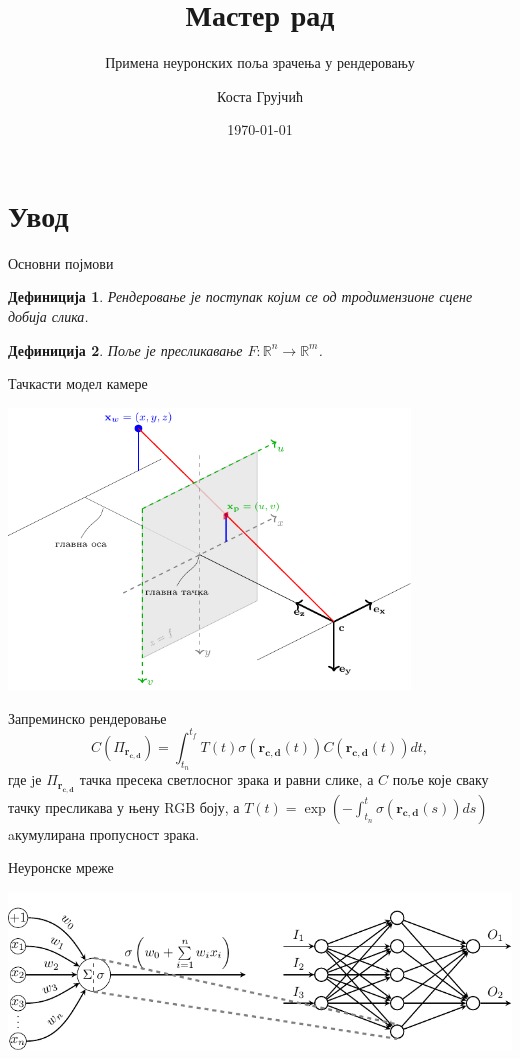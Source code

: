 \documentclass{beamer}
\title{Мастер рад}
\subtitle{Примена неуронских поља зрачења у рендеровању}  %
\author{Коста Грујчић} %
\institute{Универзитет у Београду, Математички факултет}
\date[\textcolor{white}{\today}]  %
{\today}
\newtheorem{myDef}{Дефиниција}
\begin{document}
	\frame[plain]{\titlepage}
	
	\section{Увод}
		\begin{frame}{Основни појмови}
			\begin{myDef}
				Рендеровање је поступак којим се од тродимензионе сцене добија слика.
			\end{myDef}
		
			\begin{myDef}
				Поље је пресликавање $F:\mathbb{R}^n \rightarrow \mathbb{R}^m$.
			\end{myDef}
		\end{frame}

		\begin{frame}{Тачкасти модел камере}
			\begin{center}
				\includegraphics[width=0.8\textwidth]{img/pinhole.pdf}
			\end{center}
		\end{frame}
	
		\begin{frame}{Запреминско рендеровање}
			\begin{equation*}
				C(\Pi_{\mathbf{r_{c, d}}}) = \int_{t_n}^{t_f}T(t)\sigma(\mathbf{r_{c, d}}(t))C(\mathbf{r_{c, d}}(t))dt,
			\end{equation*}
			где jе $\Pi_{\mathbf{r_{c, d}}}$ тачка пресека светлосног зрака и равни слике, а $C$ поље које сваку тачку
			пресликава у њену RGB боју, а $T(t)=\exp{\left(-\int_{t_n}^{t}\sigma(\mathbf{r_{c, d}}(s))ds\right)}$
			aкумулирана пропусност зрака.
		\end{frame}
	
		\begin{frame}{Неуронске мреже}
			\begin{center}
				\includegraphics[width=\textwidth]{img/mlp.pdf}
			\end{center}
		\end{frame}
	
\end{document}

